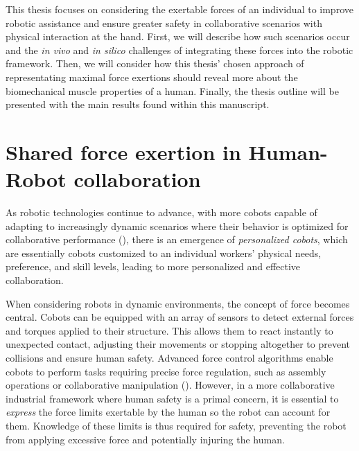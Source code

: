 This thesis focuses on considering the exertable forces of an individual to improve robotic assistance and ensure greater safety in collaborative scenarios with physical interaction at the hand. First, we will describe how such scenarios occur and the \emph{in vivo} and \emph{in silico} challenges of integrating these forces into the robotic framework. Then, we will consider how this thesis' chosen approach of representating maximal force exertions should reveal more about the biomechanical muscle properties of a human. Finally, the thesis outline will be presented with the main results found within this manuscript.

\section*{Shared force exertion in Human-Robot collaboration}
As robotic technologies continue to advance, with more cobots capable of adapting to increasingly dynamic scenarios where their behavior is optimized for collaborative performance (\cite{albertoPredictiveControlCollaborative2023}), there is an emergence of \emph{personalized cobots}, which are essentially cobots customized to an individual workers' physical needs, preference, and skill levels, leading to more personalized and effective collaboration.

When considering robots in dynamic environments, the concept of force becomes central. Cobots can be equipped with an array of sensors to detect external forces and torques applied to their structure. This allows them to react instantly to unexpected contact, adjusting their movements or stopping altogether to prevent collisions and ensure human safety. Advanced force control algorithms enable cobots to perform tasks requiring precise force regulation, such as assembly operations or collaborative manipulation (\cite{bicchiPhysicalHumanrobotInteraction2008}). However, in a more collaborative industrial framework where human safety is a primal concern, it is essential to \emph{express} the force limits exertable by the human so the robot can account for them. Knowledge of these limits is thus required for safety, preventing the robot from applying excessive force and potentially injuring the human.

